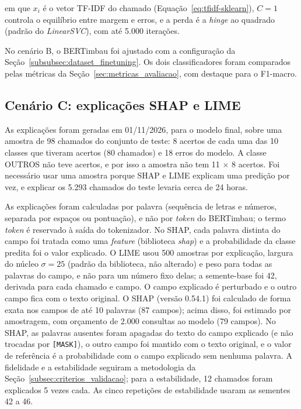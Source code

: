 \documentclass[
    12pt,                %
    openright,           %
    oneside,             %
    a4paper,             %
    english,             %
    brazil               %
]{abntex2}
\begin{document}
em que $x_i$ é o vetor TF-IDF do chamado (Equação~\ref{eq:tfidf-sklearn}), $C = 1$ controla o equilíbrio entre margem e erros, e a perda é a \textit{hinge} ao quadrado (padrão do \textit{LinearSVC}), com até 5.000 iterações.

No cenário B, o BERTimbau foi ajustado com a configuração da Seção~\ref{subsubsec:dataset_finetuning}. Os dois classificadores foram comparados pelas métricas da Seção~\ref{sec:metricas_avaliacao}, com destaque para o F1-macro.

\subsection{Cenário C: explicações SHAP e LIME}

As explicações foram geradas em 01/11/2026, para o modelo final, sobre uma amostra de 98 chamados do conjunto de teste: 8 acertos de cada uma das 10 classes que tiveram acertos (80 chamados) e 18 erros do modelo. A classe OUTROS não teve acertos, e por isso a amostra não tem 11 $\times$ 8 acertos. Foi necessário usar uma amostra porque SHAP e LIME explicam uma predição por vez, e explicar os 5.293 chamados do teste levaria cerca de 24 horas.

As explicações foram calculadas por palavra (sequência de letras e números, separada por espaços ou pontuação), e não por \textit{token} do BERTimbau; o termo \textit{token} é reservado à saída do tokenizador. No SHAP, cada palavra distinta do campo foi tratada como uma \textit{feature} (biblioteca \textit{shap}) e a probabilidade da classe predita foi o valor explicado. O LIME usou 500 amostras por explicação, largura do núcleo $\sigma = 25$ (padrão da biblioteca, não alterado) e peso para todas as palavras do campo, e não para um número fixo delas; a semente-base foi 42, derivada para cada chamado e campo. O campo explicado é perturbado e o outro campo fica com o texto original. O SHAP (versão 0.54.1) foi calculado de forma exata nos campos de até 10 palavras (87 campos); acima disso, foi estimado por amostragem, com orçamento de 2.000 consultas ao modelo (79 campos). No SHAP, as palavras ausentes foram apagadas do texto do campo explicado (e não trocadas por \texttt{[MASK]}), o outro campo foi mantido com o texto original, e o valor de referência é a probabilidade com o campo explicado sem nenhuma palavra. A fidelidade e a estabilidade seguiram a metodologia da Seção~\ref{subsec:criterios_validacao}; para a estabilidade, 12 chamados foram explicados 5 vezes cada. As cinco repetições de estabilidade usaram as sementes 42 a 46.
\end{document}

